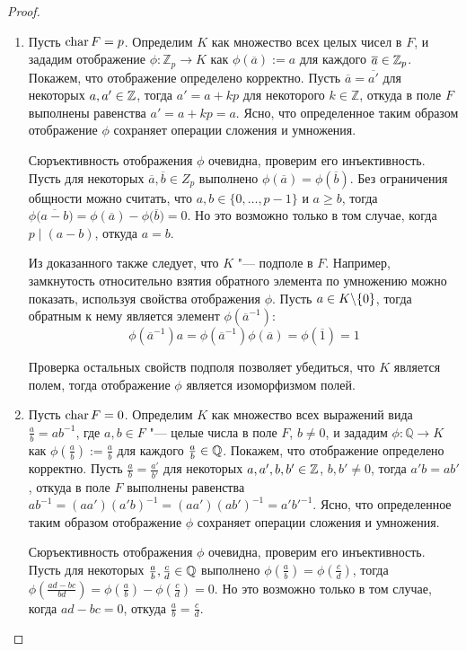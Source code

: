     \begin{proof}~
    	\begin{enumerate}
    		\item Пусть $\operatorname{char}{F} = p$. Определим $K$ как множество всех целых чисел в $F$, и зададим отображение $\phi: \mathbb{Z}_p \rightarrow K$ как $\phi(\overline{a}) := a$ для каждого $\overline{a} \in \mathbb{Z}_p$. Покажем, что отображение определено корректно. Пусть $\overline{a} = \overline{a'}$ для некоторых $a, a' \in \mathbb{Z}$, тогда $a' = a + kp$ для некоторого $k \in \mathbb{Z}$, откуда в поле $F$ выполнены равенства $a' = a + kp = a$. Ясно, что определенное таким образом отображение $\phi$ сохраняет операции сложения и умножения.
    		
    		Сюръективность отображения $\phi$ очевидна, проверим его инъективность. Пусть для некоторых $\overline{a}, \overline{b} \in Z_p$ выполнено $\phi(\overline{a}) = \phi(\overline{b})$. Без ограничения общности можно считать, что $a, b \in \{0,\dots, p-1\}$ и $a \ge b$, тогда $\phi\big(\overline{a - b}\big) = \phi(\overline{a}) - \phi\big(\overline{b}\big) = 0$. Но это возможно только в том случае, когда $p \mid (a - b)$, откуда $a = b$.
    		
    		Из доказанного также следует, что $K$ "--- подполе в $F$. Например, замкнутость относительно взятия обратного элемента по умножению можно показать, используя свойства отображения $\phi$. Пусть $a \in K \backslash \{0\}$, тогда обратным к нему является элемент $\phi(\overline{a}^{-1})$:
    		\[\phi(\overline{a}^{-1}) a = \phi(\overline{a}^{-1})\phi(\overline{a}) = \phi(\overline{1}) = 1\]
    		
    		Проверка остальных свойств подполя позволяет убедиться, что $K$ является полем, тогда отображение $\phi$ является изоморфизмом полей.
    	
    		\item Пусть $\operatorname{char}{F} = 0$. Определим $K$ как множество всех выражений вида $\frac ab = ab^{-1}$, где $a, b \in F$ "--- целые числа в поле $F$, $b \ne 0$, и зададим $\phi: \mathbb{Q} \rightarrow K$ как $\phi(\frac{a}{b}) := \frac ab$ для каждого $\frac ab \in \mathbb{Q}$. Покажем, что отображение определено корректно. Пусть $\frac{a}{b} = \frac{a'}{b'}$ для некоторых $a, a', b, b' \in \mathbb{Z}$, $b, b' \ne 0$, тогда $a'b = ab'$, откуда в поле $F$ выполнены равенства $ab^{-1} = (aa')(a'b)^{-1} = (aa')(ab')^{-1} = a'b'^{-1}$. Ясно, что определенное таким образом отображение $\phi$ сохраняет операции сложения и умножения.
    		
    		Сюръективность отображения $\phi$ очевидна, проверим его инъективность. Пусть для некоторых $\frac ab, \frac cd \in \mathbb{Q}$ выполнено $\phi(\frac ab) = \phi(\frac cd)$, тогда $\phi(\frac{ad - bc}{bd}) = \phi(\frac ab) - \phi(\frac cd) = 0$. Но это возможно только в том случае, когда ${ad - bc} = 0$, откуда $\frac ab = \frac cd$.
    		

\end{enumerate}
\end{proof}
